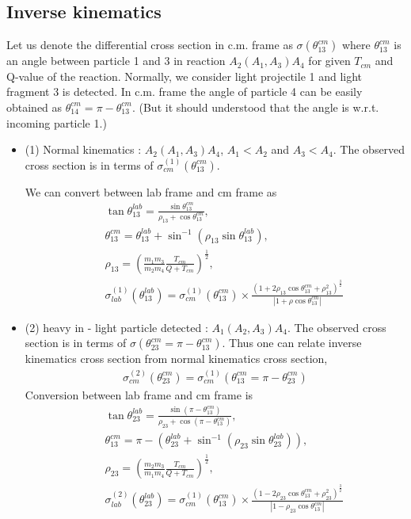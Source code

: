 \documentclass[10pt]{book}
\newcommand{\bea}{\begin{eqnarray}}
\newcommand{\eea}{\end{eqnarray}}
\newcommand{\no}{\nonumber \\}
\begin{document}
\subsection{Inverse kinematics} 
Let us denote the differential cross section in c.m. frame as
$\sigma(\theta_{13}^{cm})$ where $\theta_{13}^{cm}$ is an angle between 
particle 1 and 3 in reaction $A_2(A_1,A_3)A_4$ for given $T_{cm}$ and Q-value of the reaction. 
Normally, we consider light projectile 1 and light fragment 3 is detected. 
In c.m. frame the angle of particle 4 can be easily obtained as 
$\theta_{14}^{cm}=\pi-\theta_{13}^{cm}$. (But it should understood that the angle is w.r.t.
incoming particle 1.)
\begin{itemize}
	\item (1) Normal kinematics : $A_2(A_1,A_3)A_4$, $A_1<A_2$ and $A_3< A_4$. The observed cross section is in terms of $\sigma^{(1)}_{cm}(\theta_{13}^{cm})$. 
	
		We can convert between lab frame and cm frame as
	\bea 
	& &\tan\theta_{13}^{lab}=\frac{\sin\theta_{13}^{cm}}{\rho_{13}+\cos\theta_{13}^{cm}}, \no 
	& & \theta_{13}^{cm}=\theta^{lab}_{13}+\sin^{-1}(\rho_{13}\sin\theta_{13}^{lab}),\no 
	& &\rho_{13}=\left(\frac{m_1 m_3}{m_2 m_4}\frac{T_{cm}}{Q+T_{cm}}\right)^{\frac{1}{2}},\no 
	& & \sigma^{(1)}_{lab}(\theta_{13}^{lab})=\sigma^{(1)}_{cm}(\theta_{13}^{cm})\times \frac{(1+2\rho_{13} \cos\theta_{13}^{cm}+\rho^2_{13})^{\frac{3}{2}}}
	{|1+\rho \cos\theta_{13}^{cm}|} 
	\eea 
	
	\item (2) heavy in - light particle detected :  $A_1(A_2,A_3)A_4$.
	      The observed cross section is in terms of $\sigma(\theta_{23}^{cm}=\pi-\theta_{13}^{cm})$.
	      Thus one can relate inverse kinematics cross section from normal kinematics cross section,
	      \bea 
	      \sigma^{(2)}_{cm}(\theta_{23}^{cm}) = \sigma^{(1)}_{cm}(\theta_{13}^{cm}=\pi-\theta_{23}^{cm} )
	      \eea 
	      Conversion between lab frame and cm frame is 
	      \bea 
	      & &\tan\theta_{23}^{lab}=\frac{\sin(\pi-\theta_{13}^{cm})}{\rho_{23}+\cos(\pi-\theta_{13}^{cm})}, \no 
	      & & \theta_{13}^{cm}=\pi-(\theta_{23}^{lab}+\sin^{-1}(\rho_{23} \sin\theta_{23}^{lab})),\no 
	      & &\rho_{23}=\left(\frac{m_2 m_3}{m_1 m_4}\frac{T_{cm}}{Q+T_{cm}}\right)^{\frac{1}{2}},\no 
	      & & \sigma^{(2)}_{lab}(\theta_{23}^{lab})=\sigma^{(1)}_{cm}(\theta_{13}^{cm})\times 
	          \frac{(1-2\rho_{23} \cos\theta_{13}^{cm}+\rho^2_{23})^{\frac{3}{2}}}
	          {|1-\rho_{23} \cos\theta_{13}^{cm}|} 
	      \eea 
	      

\end{itemize}
\end{document}
